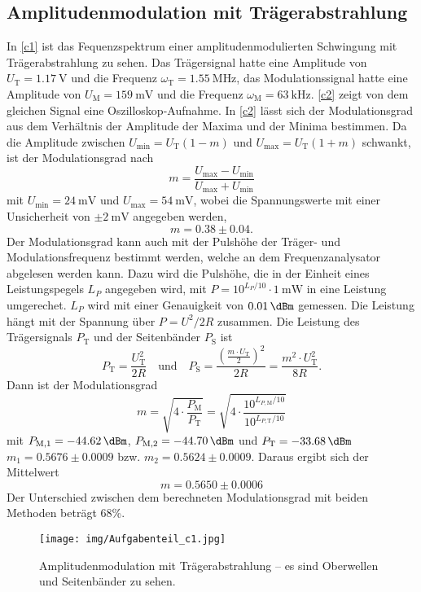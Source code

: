 \FloatBarrier

\subsection{Amplitudenmodulation mit Tr\"{a}gerabstrahlung}

In \autoref{c1} ist das Fequenzspektrum einer amplitudenmodulierten Schwingung mit Trägerabstrahlung zu sehen. Das Trägersignal hatte eine Amplitude von $U_\text{T}=\SI{1.17}{\volt}$ und die Frequenz $\omega_\text{T}=\SI{1.55}{\mega\hertz}$, das Modulationssignal hatte eine Amplitude von $U_\text{M}=\SI{159}{\milli\volt}$ und die Frequenz $\omega_\text{M}=\SI{63}{\kilo\hertz}$. \autoref{c2} zeigt von dem gleichen Signal eine Oszilloskop-Aufnahme. In \autoref{c2} lässt sich der Modulationsgrad aus dem Verhältnis der Amplitude der Maxima und der Minima bestimmen. Da die Amplitude zwischen $U_\text{min} = U_\text{T}(1 - m)$ und $U_\text{max} = U_\text{T}(1 + m)$ schwankt, ist der Modulationsgrad nach
\[
	m = \frac{U_\text{max} - U_\text{min}}{U_\text{max} + U_\text{min}}
\]
mit $U_\text{min} = \SI{24}{\milli\volt}$ und $U_\text{max} = \SI{54}{\milli\volt}$, wobei die Spannungswerte mit einer Unsicherheit von $\pm \SI{2}{\milli\volt}$ angegeben werden,
\[	
m = 0.38 \pm 0.04.
\]
\indent Der Modulationsgrad kann auch mit der Pulshöhe der Träger- und Modulationsfrequenz bestimmt werden, welche an dem Frequenzanalysator abgelesen werden kann. Dazu wird die Pulshöhe, die in der Einheit eines Leistungspegels $L_P$ angegeben wird, mit $P = 10^{L_P/10} \cdot \SI{1}{\milli\watt}$ in eine Leistung umgerechet. $L_P$ wird mit einer Genauigkeit von $\SI{0.01}{\dBm}$ gemessen. Die Leistung hängt mit der Spannung über $P = U^2/2R$ zusammen. Die Leistung des Trägersignals $P_\text{T}$ und der Seitenbänder $P_\text{S}$ ist
\[
P_\text{T} = \frac{U_\text{T}^2}{2R} \quad \text{und} \quad P_\text{S} = \frac{\left(\frac{m \cdot U_\text{T}}{2}\right)^2}{2R} = \frac{m^2 \cdot {U_\text{T}^2}}{8R}.
\]
Dann ist der Modulationsgrad
\[
	m = \sqrt{4 \cdot \frac{P_\text{M}}{P_\text{T}}} = \sqrt{4 \cdot \frac{10^{L_{P,\text{M}}/10}}{10^{L_{P,\text{T}}/10}}}
\]
mit $P_\text{M,1} = \SI{-44.62}{\dBm}$, $P_\text{M,2} = \SI{-44.70}{\dBm}$ und $P_\text{T} = \SI{-33.68}{\dBm}$ $m_1 = 0.5676 \pm 0.0009$ bzw. $m_2 = 0.5624 \pm 0.0009$. Daraus ergibt sich der Mittelwert
\[
m = 0.5650 \pm 0.0006
\]
Der Unterschied zwischen dem berechneten Modulationsgrad mit beiden Methoden beträgt 68\%.

\begin{figure}
	\centering
	\texttt{[image: img/Aufgabenteil\_c1.jpg]}
	\caption{Amplitudenmodulation mit Trägerabstrahlung -- es sind Oberwellen und Seitenbänder zu sehen.}
	\label{c1}
\end{figure}

